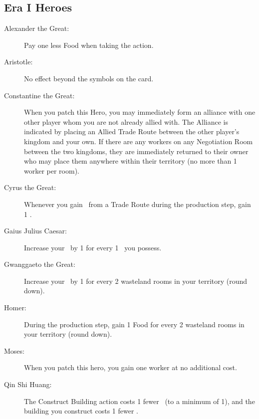 \documentclass[10pt,twocolumn]{article}
\begin{document}
\begin{appendices}
\subsection{Era I Heroes}
\begin{description}
\item[Alexander the Great:] Pay one less Food when taking the  action.
\item[Aristotle:] No effect beyond the symbols on the card.
\item[Constantine the Great:] When you patch this Hero, you may immediately form an alliance with one other player whom you are not already allied with. The Alliance is indicated by placing an Allied Trade Route between the other player's kingdom and your own. If there are any workers on any Negotiation Room between the two kingdoms, they are immediately returned to their owner who may place them anywhere within their territory (no more than 1 worker per room).
\item[Cyrus the Great:] Whenever you gain \goods\ from a Trade Route during the production step, gain 1 \vp.
\item[Gaius Julius Caesar:] Increase your \mil\ by 1 for every 1 \pol\ you possess.
\item[Gwanggaeto the Great:] Increase your \mil\ by 1 for every 2 wasteland rooms in your territory (round down).
\item[Homer:] During the production step, gain 1 Food for every 2 wasteland rooms in your territory (round down).
\item[Moses:] When you patch this hero, you gain one worker at no additional cost.
\item[Qin Shi Huang:] The Construct Building action costs 1 fewer \polfs\ (to a minimum of 1), and the building you construct costs 1 fewer \mineral.
\end{description}

\end{appendices}
\end{document}
